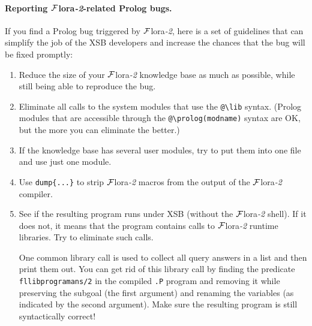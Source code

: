 \documentclass[11pt]{article}
\newcommand{\FLORA}{{\mbox{\sc ${\cal F}${lora}\rm\emph{-2}}}\xspace}
\newcommand{\FLSYSTEM}{\FLORA}
\newcommand{\bs}{\textbackslash}
\begin{document}
\paragraph{Reporting \FLSYSTEM-related Prolog bugs.}
If you find a Prolog bug triggered by \FLSYSTEM, here is a set of
guidelines that can simplify the job of the XSB developers and increase the
chances that the bug will be fixed promptly:
\begin{enumerate}
  \item  Reduce the size of your \FLSYSTEM knowledge base as much as possible, while
    still being able to reproduce the bug.
  \item  Eliminate all calls to the system modules that use the
    {\tt @\bs{}lib} syntax. (Prolog modules that are accessible
    through the {\tt @\bs{}prolog(modname)} syntax are OK, but the more you can
    eliminate the better.)
  \item If the knowledge base has several user modules, try to put them into one
    file and use just one module. 
  \item  Use {\tt dump\{...\}} to strip \FLSYSTEM macros from the output of the
    \FLSYSTEM compiler.
  \item  See if the resulting program runs under XSB (without
    the \FLSYSTEM shell). If it does not, it means that the program contains
    calls to \FLSYSTEM runtime libraries. Try to eliminate such calls.

    One common library call is used to collect all query answers in a list
    and then print them out. You can get rid of this library call by
    finding the predicate {\tt fllibprogramans/2} in the compiled {\tt .P}
    program and removing it while preserving the subgoal (the first
    argument) and renaming the variables (as indicated by the second argument).
    Make sure the resulting program is still syntactically correct!


\end{enumerate}
\end{document}
